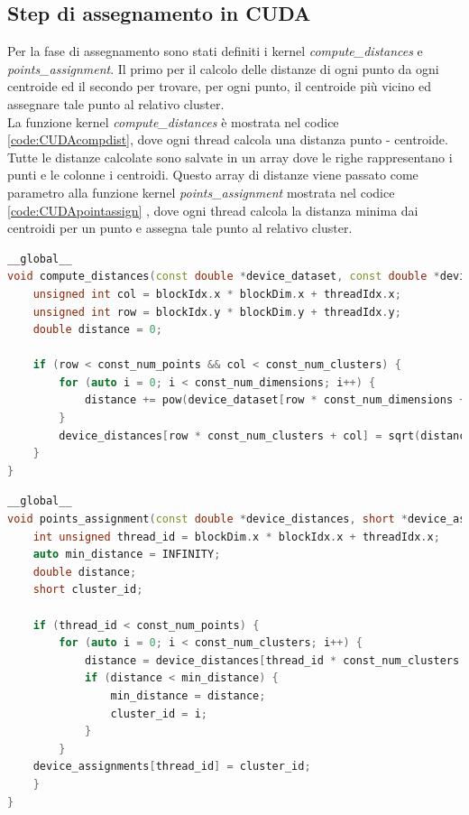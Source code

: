 \documentclass[10pt,twocolumn,letterpaper]{article}
\begin{document}
\subsection{Step di assegnamento in CUDA}
Per la fase di assegnamento sono stati definiti i kernel \textit{compute\_distances} e \textit{points\_assignment}. Il primo per il calcolo delle distanze di ogni punto da ogni centroide ed il secondo per trovare, per ogni punto, il centroide più vicino ed assegnare tale punto al relativo cluster.\\
La funzione kernel \textit{compute\_distances} è mostrata nel codice \ref{code:CUDAcompdist}, dove ogni thread calcola una distanza punto - centroide. Tutte le distanze calcolate sono salvate in un array dove le righe rappresentano i punti e le colonne i centroidi. Questo array di distanze viene passato come parametro alla funzione kernel \textit{points\_assignment} mostrata nel codice \ref{code:CUDApointassign} , dove ogni thread calcola la distanza minima dai centroidi per un punto e assegna tale punto al relativo cluster.
\begin{lstlisting}[language=c++, caption=Assegnamento: \textit{compute\_distances} , label=code:CUDAcompdist]
__global__
void compute_distances(const double *device_dataset, const double *device_centroids, double *device_distances) {
	unsigned int col = blockIdx.x * blockDim.x + threadIdx.x;
	unsigned int row = blockIdx.y * blockDim.y + threadIdx.y;
	double distance = 0;
	
	if (row < const_num_points && col < const_num_clusters) {
		for (auto i = 0; i < const_num_dimensions; i++) {
			distance += pow(device_dataset[row * const_num_dimensions + i] - device_centroids[col * const_num_dimensions + i],2);
		}
		device_distances[row * const_num_clusters + col] = sqrt(distance);
	}
}

\end{lstlisting}
\begin{lstlisting}[language=c++, caption=Assegnamento: \textit{points\_assignment}, label=code:CUDApointassign]
__global__
void points_assignment(const double *device_distances, short *device_assignments) {
	int unsigned thread_id = blockDim.x * blockIdx.x + threadIdx.x;
	auto min_distance = INFINITY;
	double distance;
	short cluster_id;
	
	if (thread_id < const_num_points) {
		for (auto i = 0; i < const_num_clusters; i++) {
			distance = device_distances[thread_id * const_num_clusters + i];
			if (distance < min_distance) {
				min_distance = distance;
				cluster_id = i;
			}
		}
	device_assignments[thread_id] = cluster_id;
	}
}
\end{lstlisting}
\end{document}
